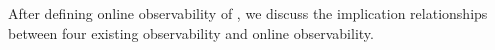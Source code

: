 After defining online observability of \BCNs, we discuss the implication relationships between four existing observability and online observability. %

